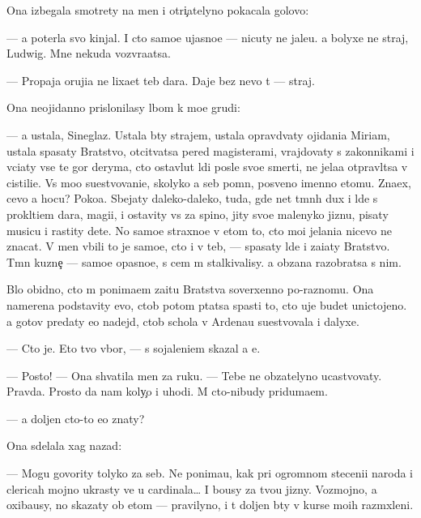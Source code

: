 \documentclass[10pt]{book}
\begin{document}
Ona izbegala smotrety na men{\ia} i otri{\c}atelyno pokacala golovo{\y}:

— {\Y}a poter{\ia}la svo{\y} kinjal. I cto samo{\y}e ujasno{\y}e — nicuty ne jale{\y}u. {\Y}a bolyxe ne straj, Ludwig. Mne nekuda vozvra{\x}atsa.

— Propaja oruji{\y}a ne lixa{\y}et teb{\ia} dara. Daje bez nevo t{\yi} — straj.

Ona neojidanno prislonilasy lbom k mo{\y}e{\y} grudi:

— {\Y}a ustala, Sineglaz{\yi}{\y}. Ustala b{\yi}ty strajem, ustala opravd{\yi}vaty ojidani{\y}a Miriam, ustala spasaty Bratstvo, otcit{\yi}vatsa pered magisterami, vrajdovaty s zakonnikami i v{\yi}ci{\x}aty vse te gor{\yi} deryma, cto ostavl{\ia}{\y}ut l{\io}di posle svo{\y}e{\y} smerti, ne jela{\y}a otpravl{\ia}tsa v cistili{\x}e. Vs{\e} mo{\y}o su{\x}estvovani{\y}e, skolyko {\y}a seb{\ia} pomn{\io}, posv{\ia}{\x}eno imenno etomu. Zna{\y}ex, cevo {\y}a hocu? Poko{\y}a. Sbejaty daleko-daleko, tuda, gde net t{\e}mn{\yi}h dux i l{\io}de{\y} s prokl{\ia}ti{\y}em dara, magi{\y}i, i ostavity vs{\e} za spino{\y}, jity svo{\y}e{\y} malenyko{\y} jizn{\y}u, pisaty musicu i rastity dete{\y}. No samo{\y}e straxno{\y}e v etom to, cto mo{\y}i jelani{\y}a nicevo ne znacat. V men{\ia} vbili to je samo{\y}e, cto i v teb{\ia}, — spasaty l{\io}de{\y} i za{\x}i{\x}aty Bratstvo. T{\e}mn{\yi}{\y} kuzne{\c} — samo{\y}e opasno{\y}e, s cem m{\yi} stalkivalisy. {\Y}a ob{\ia}zana razobratsa s nim.

B{\yi}lo obidno, cto m{\yi} ponima{\y}em za{\x}itu Bratstva soverxenno po-raznomu. Ona namerena podstavity {\y}evo, ctob{\yi} potom p{\yi}tatsa spasti to, cto uje budet unictojeno. {\Y}a gotov predaty {\y}e{\y}o nadejd{\yi}, ctob{\yi} schola v Ardenau su{\x}estvovala i dalyxe.

— Cto je. Eto tvo{\y} v{\yi}bor, — s sojaleni{\y}em skazal {\y}a {\y}e{\y}.

— Posto{\y}! — Ona shvatila men{\ia} za ruku. — Tebe ne ob{\ia}zatelyno ucastvovaty. Pravda. Prosto da{\y} nam koly{\c}o i uhodi. M{\yi} cto-nibudy priduma{\y}em.

— {\Y}a doljen cto-to {\y}e{\x}o znaty?

Ona sdelala xag nazad:

— Mogu govority tolyko za seb{\ia}. Ne ponima{\y}u, kak pri ogromnom steceni{\y}i naroda i clericah mojno ukrasty ve{\x} u cardinala… I bo{\y}usy za tvo{\y}u jizny. Vozmojno, {\y}a oxiba{\y}usy, no skazaty ob etom — pravilyno, i t{\yi} doljen b{\yi}ty v kurse mo{\y}ih razm{\yi}xleni{\y}.
\end{document}
